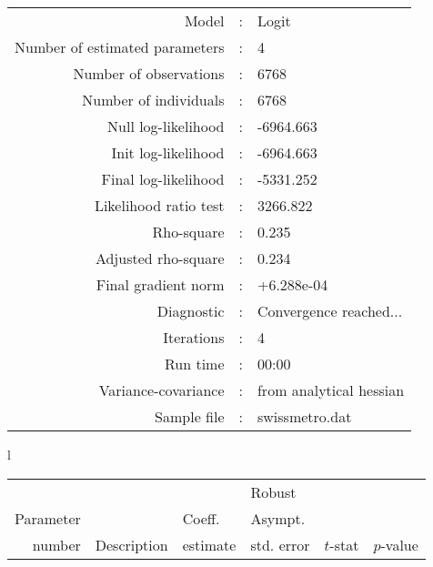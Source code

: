 \documentclass[12pt,a4paper]{article}
\begin{document}
\begin{table}[htb]
\footnotesize
\begin{flushleft}
\begin{tabular}{rcl}
\hline
Model &:& Logit\\
Number of estimated parameters&:&4\\
Number of  observations &:& 6768\\
Number of individuals&:&6768\\
Null log-likelihood&:&-6964.663\\
Init log-likelihood&:&-6964.663\\
Final log-likelihood&:&-5331.252\\
Likelihood ratio test &:&3266.822\\
Rho-square&:&0.235\\
Adjusted rho-square&:&0.234\\
Final gradient norm&:&+6.288e-04\\
Diagnostic&:&Convergence reached...\\
Iterations&:&4\\
Run time&:&00:00\\
Variance-covariance&:&from analytical hessian
\\
Sample file&:&swissmetro.dat\\
\end{tabular}
\end{flushleft}
  \begin{tabular}{l}
\begin{tabular}{rlr@{.}lr@{.}lr@{.}lr@{.}l}
         &                       &   \multicolumn{2}{l}{}    & \multicolumn{2}{l}{Robust}  &     \multicolumn{4}{l}{}   \\
Parameter &                       &   \multicolumn{2}{l}{Coeff.}      & \multicolumn{2}{l}{Asympt.}  &     \multicolumn{4}{l}{}   \\
number &  Description                     &   \multicolumn{2}{l}{estimate}      & \multicolumn{2}{l}{std. error}  &   \multicolumn{2}{l}{$t$-stat}  &   \multicolumn{2}{l}{$p$-value}   \\

\hline


\end{tabular}
\end{tabular}
\end{table}
\end{document}
